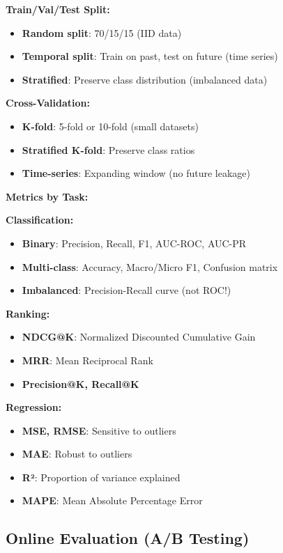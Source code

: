 \documentclass[8pt,landscape]{article}
\begin{document}
\begin{multicols}{3}
\textbf{Train/Val/Test Split:}
\begin{itemize}
\item \textbf{Random split}: 70/15/15 (IID data)
\item \textbf{Temporal split}: Train on past, test on future (time series)
\item \textbf{Stratified}: Preserve class distribution (imbalanced data)
\end{itemize}

\textbf{Cross-Validation:}
\begin{itemize}
\item \textbf{K-fold}: 5-fold or 10-fold (small datasets)
\item \textbf{Stratified K-fold}: Preserve class ratios
\item \textbf{Time-series}: Expanding window (no future leakage)
\end{itemize}

\textbf{Metrics by Task:}

\textbf{Classification:}
\begin{itemize}
\item \textbf{Binary}: Precision, Recall, F1, AUC-ROC, AUC-PR
\item \textbf{Multi-class}: Accuracy, Macro/Micro F1, Confusion matrix
\item \textbf{Imbalanced}: Precision-Recall curve (not ROC!)
\end{itemize}

\textbf{Ranking:}
\begin{itemize}
\item \textbf{NDCG@K}: Normalized Discounted Cumulative Gain
\item \textbf{MRR}: Mean Reciprocal Rank
\item \textbf{Precision@K, Recall@K}
\end{itemize}

\textbf{Regression:}
\begin{itemize}
\item \textbf{MSE, RMSE}: Sensitive to outliers
\item \textbf{MAE}: Robust to outliers
\item \textbf{R²}: Proportion of variance explained
\item \textbf{MAPE}: Mean Absolute Percentage Error
\end{itemize}

\subsection*{Online Evaluation (A/B Testing)}


\end{multicols}
\end{document}
